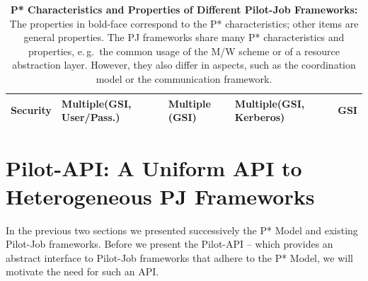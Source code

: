 \documentclass[conference]{IEEEtran}
\begin{document}
\begin{table}[t]
\begin{tabular}{|p{1.2cm}|p{1.3cm}|p{1.2cm}|p{1.4cm}|p{1.5cm}|}
Security &Multiple\newline (GSI, User/Pass.) &Multiple (GSI) &Multiple\newline (GSI, 
Kerberos) &GSI\\ 

\hline


	
\end{tabular}
\caption{\textbf{P* Characteristics and Properties of Different Pilot-Job 
Frameworks:} The properties
in bold-face correspond to the P* characteristics; other items are general 
properties. The PJ frameworks share many P* characteristics and 
properties, e.\,g.\ the common usage of the M/W scheme or of a 
resource abstraction layer. However, they also differ in aspects, such as  
the coordination model or the communication framework. \upp
}
\label{table:pilot-job-comparison}
\end{table}

%
%


\section{Pilot-API: A Uniform API to Heterogeneous PJ Frameworks}
\label{sec:pilot-api}




In the previous two sections we presented successively the P* Model
and existing Pilot-Job frameworks. Before we present the Pilot-API --
which provides an abstract interface to Pilot-Job frameworks that
adhere to the P* Model, we will motivate the need for such an API.
\end{document}

